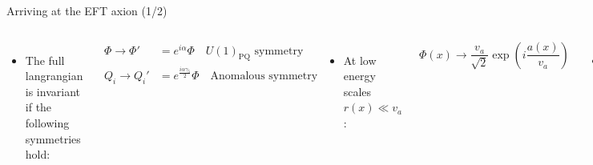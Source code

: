\documentclass[aspectratio=1610, 9pt]{beamer}
\begin{document}
\begin{frame}{Arriving at the EFT axion (1/2)}
  \begin{columns}
    \column{\textwidth}
    \begin{itemize}
      \item The full langrangian is invariant if the following symmetries hold:
    \end{itemize}
    \begin{align*}
      \Phi \rightarrow \Phi' &= e^{i \alpha} \Phi \quad U(1)_{\text{PQ}} \,\, \text{symmetry} \\
      Q_i \rightarrow Q_i' &= e^{\frac{i \alpha \gamma_5}{2}} \Phi \quad \text{Anomalous symmetry}
    \end{align*}
    \begin{itemize}
      \item At low energy scales $r(x) \ll v_a$:
    \end{itemize}
    \begin{equation*}
      \Phi(x) \rightarrow \frac{v_a}{\sqrt{2}}\exp \left( i\frac{a(x)}{v_a} \right) 
    \end{equation*}
    \begin{itemize}
      \item Substitute into $\mathcal{L}_{\text{int}}$ and define quark masses $m_i = \frac{y_i v_a}{\sqrt{2}}$:
    \end{itemize}
    \begin{equation*}
      \mathcal{L}_{\text{int}} = \sum_i \bar{Q}_i i \not{D} Q_i - \sum_i \left( m_i \bar{Q}_i Q_i \exp \left( i\frac{a(x)}{v_a} \right) + \text{h.c.} \right)
    \end{equation*}
  \end{columns} 
\end{frame}
\end{document}
